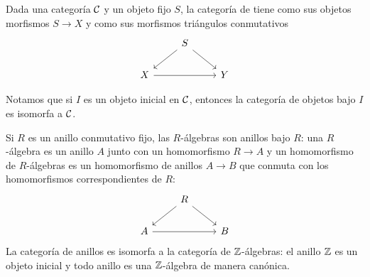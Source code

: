 \documentclass{article}
\numberwithin{equation}{section}
\theoremstyle{definition}
\begin{document}
\begin{definicion}
  Dada una categoría $\mathcal{C}$ y un objeto fijo $S$, la categoría
  de  tiene como sus objetos morfismos $S\to X$ y
  como sus morfismos triángulos conmutativos
  \[ \begin{tikzcd}
      & S\ar{dl}\ar{dr} \\
      X\ar{rr} && Y
    \end{tikzcd} \]
\end{definicion}

Notamos que si $I$ es un objeto inicial en $\mathcal{C}$, entonces la categoría
de objetos bajo $I$ es isomorfa a $\mathcal{C}$.

\begin{ejemplo}
  Si $R$ es un anillo conmutativo fijo, las $R$-álgebras son anillos bajo $R$:
  una $R$-álgebra es un anillo $A$ junto con un homomorfismo $R \to A$ y
  un homomorfismo de $R$-álgebras es un homomorfismo de anillos $A\to B$ que
  conmuta con los homomorfismos correspondientes de $R$:
  \[ \begin{tikzcd}
      & R\ar{dl}\ar{dr} \\
      A\ar{rr} && B
    \end{tikzcd} \]
  La categoría de anillos es isomorfa a la categoría de $\mathbb{Z}$-álgebras:
  el anillo $\mathbb{Z}$ es un objeto inicial y todo anillo es una $\mathbb{Z}$-álgebra de
  manera canónica.
\end{ejemplo}
\end{document}
